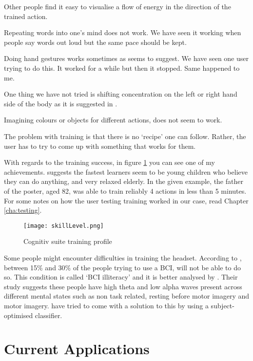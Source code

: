 Other people find it easy to visualise a flow of energy in the direction of the trained action. 

Repeating words into one's mind does not work. We have seen it working when people say words out loud but the same pace should be kept.

Doing hand gestures works sometimes as \cite{emoTraining} seems to suggest. We have seen one user trying to do this. It worked for a while but then it stopped. Same happened to me.

One thing we have not tried is shifting concentration on the left or right hand side of the body as it is suggested in \cite{emoTraining}.

Imagining colours or objects for different actions, does not seem to work.

The problem with training is that there is no `recipe' one can follow. Rather, the user has to try to come up with something that works for them. 

With regards to the training success, in figure \ref{fig:skillLevelMe} you can see one of my achievements. \cite{emoTraining} suggests the fastest learners seem to be young children who believe they can do anything, and very relaxed elderly. In the given example, the father of the poster, aged 82, was able to train reliably 4 actions in less than 5 minutes. For some notes on how the user testing training worked in our case, read Chapter \ref{cha:testing}.

\begin{figure}
  \centering
  \texttt{[image: skillLevel.png]}
  \caption{Cognitiv suite training profile}
    \label{fig:skillLevelMe}          
\end{figure}

Some people might encounter difficulties in training the headset. According to \cite{cureBCIilliteracy}, between 15\% and 30\% of the people trying to use a BCI, will not be able to do so. This condition is called `BCI illiteracy' and it is better analysed by \cite{BCIilliteracy}. Their study suggests these people have high theta and low alpha waves present across different mental states such as non task related, resting before motor imagery and motor imagery. \cite{cureBCIilliteracy} have tried to come with a solution to this by using a subject-optimised classifier.

\section{Current Applications}
\label{sec:currentApplication}

